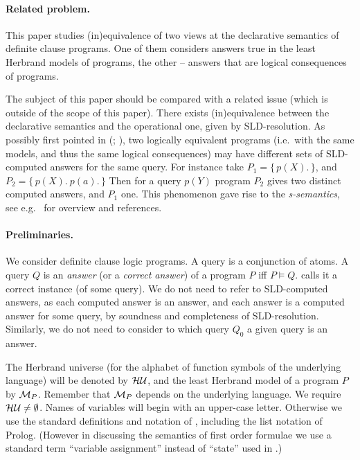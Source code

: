 \documentclass[a4paper]{tlp2}
\newcommand*{\HU}{{\ensuremath{\cal H U}}\xspace}
\newcommand*{\M}{{\ensuremath{\cal M}}\xspace}
\begin{document}
\paragraph{Related problem.}

This paper studies (in)equivalence of
two views at the declarative semantics of definite
clause programs.  One of them considers answers true in the least Herbrand
models of programs, the other -- answers that are logical consequences of
programs.  
 


The subject of this paper should be compared with a related issue
(which is outside of the scope of this paper).
There exists (in)equivalence between the declarative
semantics and the operational one, given by SLD-resolution.  
  As possibly first pointed in
(;\,\,),
two logically equivalent programs 
(i.e.\ with the same models, and thus the same logical consequences)
may have different sets of SLD-computed answers for the same query.
For instance take
$P_1= \{\, p(X).\,\}$, and 
$P_2= \{\, p(X).\ p(a).\,\}$
Then for a query $p(Y)$ program $P_2$ gives two distinct computed answers,
and $P_1$ one.  This phenomenon gave rise to the {\em s-semantics}, 
see e.g.\ \cite{DBLP:journals/tcs/Bossi09} for overview and references.





\paragraph{Preliminaries.}

We consider definite clause logic programs.  A query is a conjunction of atoms.
A query $Q$  is an {\em answer} (or a {\em correct answer}) of a program $P$  
iff $P\models Q$.
 calls it a correct instance (of some query).
We do not need to refer to SLD-computed answers, as
each computed answer is an
answer, and each answer is a computed answer for some query,
by soundness and completeness of SLD-resolution.
Similarly, we do not need to consider to which query $Q_0$ a given query is
an answer.



The Herbrand universe
(for the alphabet of function symbols of the underlying language) 
will be denoted by \HU, and the least Herbrand model of a program $P$ by $\M_P$.
Remember that $\M_P$ depends on the underlying language.
We require $\HU\neq\emptyset$.
Names of variables will begin with an upper-case letter.
Otherwise we use the standard definitions and notation of \cite{Apt-Prolog},
including the list notation of Prolog.
(However in discussing the semantics of first order formulae we use a
standard term ``variable assignment'' instead of ``state'' 
used in \cite{Apt-Prolog}.)
\end{document}
